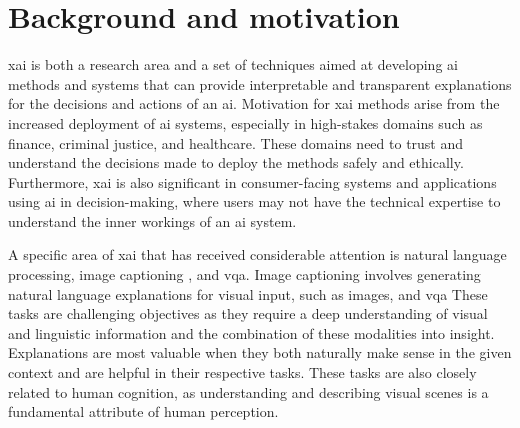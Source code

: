 \label{sec:1_1_background_and_motivation}

\begin{comment}
In about a page, summarize the most important background information. The text usually leads to YOUR PROBLEM STATEMENT (in the next section) and gives arguments about why this is a challenge today.
\end{comment}

\section{Background and motivation}

\gls{xai} is both a research area and a set of techniques aimed at developing \gls{ai} methods and systems that can provide interpretable and transparent explanations for the decisions and actions of an \gls{ai}. Motivation for \gls{xai} methods arise from the increased deployment of \gls{ai} systems, especially in high-stakes domains such as finance, criminal justice, and healthcare. These domains need to trust and understand the decisions made to deploy the methods safely and ethically. Furthermore, \gls{xai} is also significant in consumer-facing systems and applications using \gls{ai} in decision-making, where users may not have the technical expertise to understand the inner workings of an \gls{ai} system.

A specific area of \gls{xai} that has received considerable attention is natural language processing, image captioning \cite{vinyalsShowTellNeural2015, youImageCaptioningSemantic2016, vinyalsShowTellLessons2017}, and \gls{vqa}. Image captioning involves generating natural language explanations for visual input, such as images, and \gls{vqa} 
These tasks are challenging objectives as they require a deep understanding of visual and linguistic information and the combination of these modalities into insight. Explanations are most valuable when they both naturally make sense in the given context and are helpful in their respective tasks. These tasks are also closely related to human cognition, as understanding and describing visual scenes is a fundamental attribute of human perception. 

